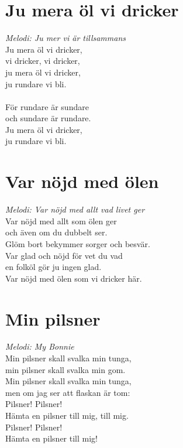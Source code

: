 \section{Ju mera öl vi dricker}
\textit{Melodi: Ju mer vi är tillsammans}
\vspace{2mm}\\
Ju mera öl vi dricker,\\
vi dricker, vi dricker,\\
ju mera öl vi dricker,\\
ju rundare vi bli.\\
\\
För rundare är sundare\\
och sundare är rundare.\\
Ju mera öl vi dricker,\\
ju rundare vi bli.

\section{Var nöjd med ölen}
\textit{Melodi: Var nöjd med allt vad livet ger}
\vspace{2mm}\\
Var nöjd med allt som ölen ger\\
och även om du dubbelt ser.\\
Glöm bort bekymmer sorger och besvär.\\
Var glad och nöjd för vet du vad\\
en folköl gör ju ingen glad.\\
Var nöjd med ölen som vi dricker här.

\section{Min pilsner}
\textit{Melodi: My Bonnie}
\vspace{2mm}\\
Min pilsner skall svalka min tunga,\\
min pilsner skall svalka min gom.\\
Min pilsner skall svalka min tunga,\\
men om jag ser att flaskan är tom:\\
Pilsner! Pilsner!\\
Hämta en pilsner till mig, till mig.\\
Pilsner! Pilsner!\\
Hämta en pilsner till mig!
